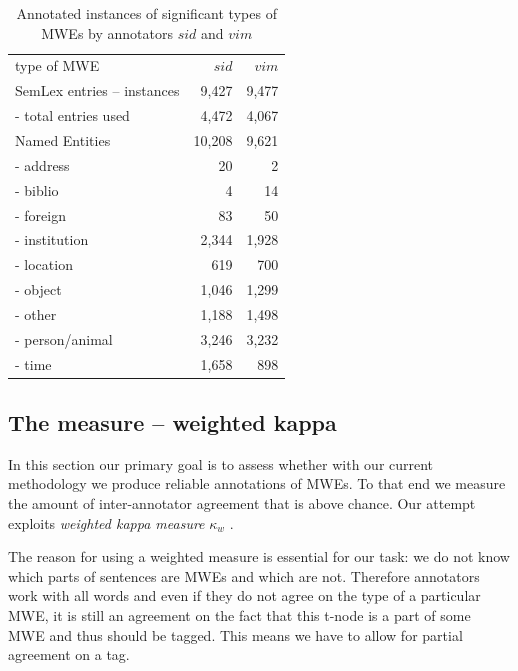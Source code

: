 \begin{table}[h]
\centering
\begin{tabular}{l|r|r}
type of MWE&$sid$&$vim$\\
\cline{1-3}
SemLex entries -- instances&9,427&9,477\\
 - total entries used&4,472&4,067\\
Named Entities&10,208&9,621\\
 - address & 20 & 2 \\
 - biblio & 4 & 14 \\
 - foreign & 83 & 50 \\
 - institution&2,344&1,928\\
 - location&619&700\\
 - object&1,046&1,299\\
 - other&1,188&1,498\\
   - person/animal&3,246&3,232\\
      - time&1,658&898\\

\end{tabular}
\caption{Annotated instances of significant types of MWEs by annotators $sid$ and $vim$}
\label{tab:anot}
\end{table}


\subsection{The measure -- weighted kappa}
\label{agreement}

In this section our primary goal is to assess whether with our current methodology we produce reliable annotations of MWEs. To that end we measure the amount of inter-annotator agreement that is above chance. Our attempt exploits {\it weighted kappa measure} $\kappa_w$ \cite{cohen:1968}.

The reason for using a weighted measure is essential for our task: we do not know which parts of sentences are MWEs and which are not. Therefore annotators work with all words and even if they do not agree on the type of a particular MWE, it is still an agreement on the fact that this t-node is a part of some MWE and thus should be tagged. This means we have to allow for partial agreement on a tag.

